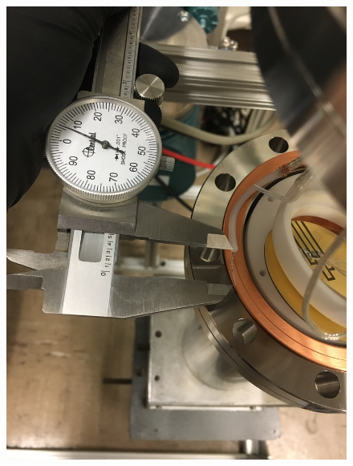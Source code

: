 \begin{figure}[htbp]
\begin{minipage}{0.32\textwidth}
    \includegraphics[width=\linewidth, angle=270]{figures/testbed/ft6_2.jpg}
    \end{minipage}
        \hspace{\fill} %
    \begin{minipage}{0.32\textwidth}

\end{minipage}
\end{figure}

